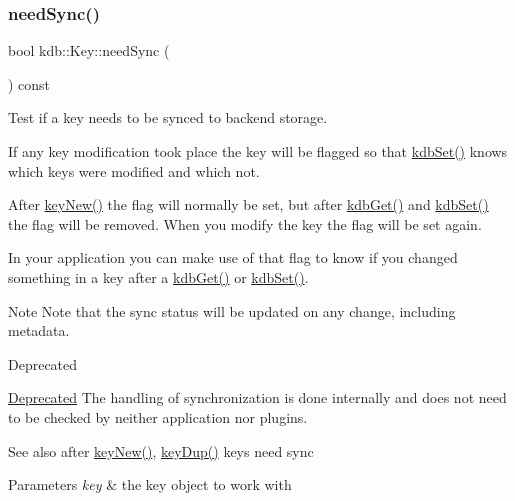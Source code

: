 \subsubsection{\texorpdfstring{needSync()}{needSync()}}
{\footnotesize\ttfamily bool kdb\+::\+Key\+::need\+Sync (\begin{DoxyParamCaption}{ }\end{DoxyParamCaption}) const\hspace{0.3cm}{\ttfamily [inline]}}



Test if a key needs to be synced to backend storage. 

If any key modification took place the key will be flagged so that \mbox{\hyperlink{group__kdb_ga11436b058408f83d303ca5e996832bcf}{kdb\+Set()}} knows which keys were modified and which not.

After \mbox{\hyperlink{group__key_gad23c65b44bf48d773759e1f9a4d43b89}{key\+New()}} the flag will normally be set, but after \mbox{\hyperlink{group__kdb_ga28e385fd9cb7ccfe0b2f1ed2f62453a1}{kdb\+Get()}} and \mbox{\hyperlink{group__kdb_ga11436b058408f83d303ca5e996832bcf}{kdb\+Set()}} the flag will be removed. When you modify the key the flag will be set again.

In your application you can make use of that flag to know if you changed something in a key after a \mbox{\hyperlink{group__kdb_ga28e385fd9cb7ccfe0b2f1ed2f62453a1}{kdb\+Get()}} or \mbox{\hyperlink{group__kdb_ga11436b058408f83d303ca5e996832bcf}{kdb\+Set()}}.

\begin{DoxyNote}{Note}
Note that the sync status will be updated on any change, including metadata.
\end{DoxyNote}
\begin{DoxyRefDesc}{Deprecated}
\item[\mbox{\hyperlink{deprecated__deprecated000012}{Deprecated}}]The handling of synchronization is done internally and does not need to be checked by neither application nor plugins.\end{DoxyRefDesc}


\begin{DoxySeeAlso}{See also}
after \mbox{\hyperlink{group__key_gad23c65b44bf48d773759e1f9a4d43b89}{key\+New()}}, \mbox{\hyperlink{group__key_gae6ec6a60cc4b8c1463fa08623d056ce3}{key\+Dup()}} keys need sync
\end{DoxySeeAlso}

\begin{DoxyParams}{Parameters}
{\em key} & the key object to work with \\
\hline
\end{DoxyParams}

